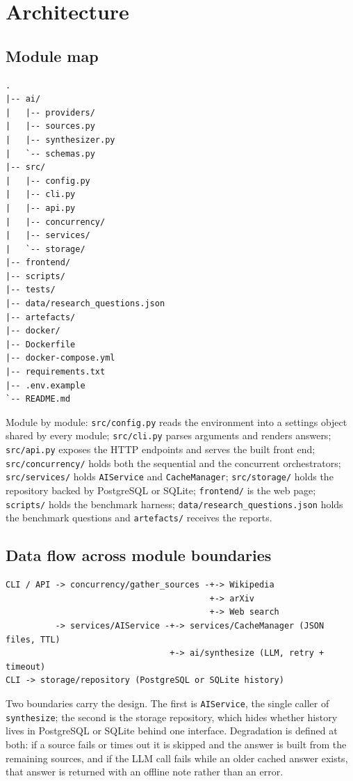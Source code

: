 \documentclass[11pt,a4paper]{article}
\newcommand{\code}[1]{\texttt{\small #1}}
\begin{document}
\section{Architecture}

\subsection{Module map}
\begin{lstlisting}[style=plain,caption={Repository layout}]
.
|-- ai/
|   |-- providers/
|   |-- sources.py
|   |-- synthesizer.py
|   `-- schemas.py
|-- src/
|   |-- config.py
|   |-- cli.py
|   |-- api.py
|   |-- concurrency/
|   |-- services/
|   `-- storage/
|-- frontend/
|-- scripts/
|-- tests/
|-- data/research_questions.json
|-- artefacts/
|-- docker/
|-- Dockerfile
|-- docker-compose.yml
|-- requirements.txt
|-- .env.example
`-- README.md
\end{lstlisting}

Module by module: \code{src/config.py} reads the environment into a settings
object shared by every module; \code{src/cli.py} parses arguments and renders
answers; \code{src/api.py} exposes the HTTP endpoints and serves the built front
end; \code{src/concurrency/} holds both the sequential and the concurrent
orchestrators; \code{src/services/} holds \code{AIService} and
\code{CacheManager}; \code{src/storage/} holds the repository backed by
PostgreSQL or SQLite; \code{frontend/} is the web page; \code{scripts/} holds
the benchmark harness; \code{data/research\_questions.json} holds the benchmark
questions and \code{artefacts/} receives the reports.

\subsection{Data flow across module boundaries}
\begin{lstlisting}[style=plain,caption={How it fits together}]
CLI / API -> concurrency/gather_sources -+-> Wikipedia
                                         +-> arXiv
                                         +-> Web search
          -> services/AIService -+-> services/CacheManager (JSON files, TTL)
                                 +-> ai/synthesize (LLM, retry + timeout)
CLI -> storage/repository (PostgreSQL or SQLite history)
\end{lstlisting}

Two boundaries carry the design. The first is \code{AIService}, the single
caller of \code{synthesize}; the second is the storage repository, which hides
whether history lives in PostgreSQL or SQLite behind one interface. Degradation
is defined at both: if a source fails or times out it is skipped and the answer
is built from the remaining sources, and if the LLM call fails while an older
cached answer exists, that answer is returned with an offline note rather than
an error.
\end{document}
